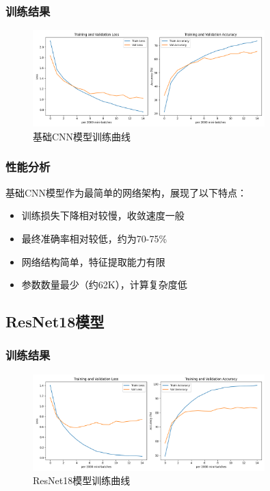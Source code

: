 \documentclass[12pt,a4paper]{article}
\begin{document}
\subsubsection{训练结果}
\begin{figure}[H]
\centering
\includegraphics[width=0.8\textwidth]{../image/training_curves_cnn.png}
\caption{基础CNN模型训练曲线}
\label{fig:cnn_curves}
\end{figure}

\subsubsection{性能分析}
基础CNN模型作为最简单的网络架构，展现了以下特点：
\begin{itemize}
    \item 训练损失下降相对较慢，收敛速度一般
    \item 最终准确率相对较低，约为70-75\%
    \item 网络结构简单，特征提取能力有限
    \item 参数数量最少（约62K），计算复杂度低
\end{itemize}

\subsection{ResNet18模型}
\subsubsection{训练结果}
\begin{figure}[H]
\centering
\includegraphics[width=0.8\textwidth]{../image/training_curves_resnet.png}
\caption{ResNet18模型训练曲线}
\label{fig:resnet_curves}
\end{figure}
\end{document}
